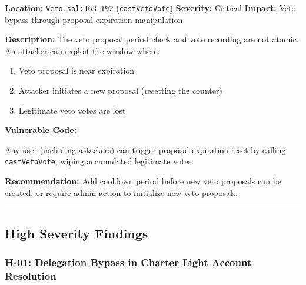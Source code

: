 \documentclass[
]{article}
\newenvironment{Shaded}{}{}
\newcommand{\NormalTok}[1]{#1}
\providecommand{\tightlist}{%
  \setlength{\itemsep}{0pt}\setlength{\parskip}{0pt}}
\begin{document}
\textbf{Location:} \texttt{Veto.sol:163-192} (\texttt{castVetoVote})
\textbf{Severity:} Critical \textbf{Impact:} Veto bypass through
proposal expiration manipulation

\textbf{Description:} The veto proposal period check and vote recording
are not atomic. An attacker can exploit the window where:

\begin{enumerate}
\def\labelenumi{\arabic{enumi}.}
\tightlist
\item
  Veto proposal is near expiration
\item
  Attacker initiates a new proposal (resetting the counter)
\item
  Legitimate veto votes are lost
\end{enumerate}

\textbf{Vulnerable Code:}

\begin{Shaded}
\end{Shaded}

Any user (including attackers) can trigger proposal expiration reset by
calling \texttt{castVetoVote}, wiping accumulated legitimate votes.

\textbf{Recommendation:} Add cooldown period before new veto proposals
can be created, or require admin action to initialize new veto
proposals.

\begin{center}\rule{0.5\linewidth}{0.5pt}\end{center}

\subsection{High Severity Findings}\label{high-severity-findings}

\subsubsection{H-01: Delegation Bypass in Charter Light Account
Resolution}\label{h-01-delegation-bypass-in-charter-light-account-resolution}
\end{document}
